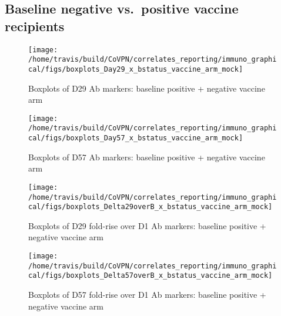 \documentclass[]{book}
\theoremstyle{definition}
\theoremstyle{definition}
\theoremstyle{definition}
\newcommand{\1}{\mathbbm{1}}
\begin{document}
\hypertarget{baseline-negative-vs.positive-vaccine-recipients}{%
\subsection{Baseline negative vs.~positive vaccine recipients}\label{baseline-negative-vs.positive-vaccine-recipients}}

\begin{figure}[H]

{\centering \texttt{[image: /home/travis/build/CoVPN/correlates\_reporting/immuno\_graphical/figs/boxplots\_Day29\_x\_bstatus\_vaccine\_arm\_mock]} 

}

\caption{Boxplots of D29 Ab markers: baseline positive + negative vaccine arm}\label{fig:unnamed-chunk-45}
\end{figure}

\begin{figure}[H]

{\centering \texttt{[image: /home/travis/build/CoVPN/correlates\_reporting/immuno\_graphical/figs/boxplots\_Day57\_x\_bstatus\_vaccine\_arm\_mock]} 

}

\caption{Boxplots of D57 Ab markers: baseline positive + negative vaccine arm}\label{fig:unnamed-chunk-46}
\end{figure}

\begin{figure}[H]

{\centering \texttt{[image: /home/travis/build/CoVPN/correlates\_reporting/immuno\_graphical/figs/boxplots\_Delta29overB\_x\_bstatus\_vaccine\_arm\_mock]} 

}

\caption{Boxplots of D29 fold-rise over D1 Ab markers: baseline positive + negative vaccine arm}\label{fig:unnamed-chunk-47}
\end{figure}

\begin{figure}[H]

{\centering \texttt{[image: /home/travis/build/CoVPN/correlates\_reporting/immuno\_graphical/figs/boxplots\_Delta57overB\_x\_bstatus\_vaccine\_arm\_mock]} 

}

\caption{Boxplots of D57 fold-rise over D1 Ab markers: baseline positive + negative vaccine arm}\label{fig:unnamed-chunk-48}
\end{figure}
\end{document}
